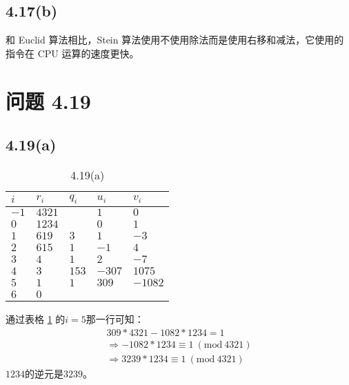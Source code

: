 \documentclass[acmlarge,screen]{acmart}
\begin{document}
\subsection{4.17(b)}
和 Euclid 算法相比，Stein 算法使用不使用除法而是使用右移和减法，它使用的指令在 CPU 运算的速度更快。
\section{问题 4.19}
\subsection{4.19(a)}
\begin{table}
  \caption{4.19(a)}
  \label{tab:4.19(a)}
  \begin{tabular}{m{5em} m{5em} m{5em} m{5em} m{5em}}
    \toprule
    $i$&$r_i$&$q_i$&$u_i$&$v_i$\\
    \midrule
    $-1$&$4321$&&$1$&$0$\\
    $0$&$1234$&&$0$&$1$\\
	$1$&$619$&$3$&$1$&$-3$\\
	$2$&$615$&$1$&$-1$&$4$\\
	$3$&$4$&$1$&$2$&$-7$\\
	$4$&$3$&$153$&$-307$&$1075$\\
	$5$&$1$&$1$&$309$&$-1082$\\
	$6$&$0$&&&\\
  \bottomrule
\end{tabular}
\end{table}
通过表格 \ref{tab:4.19(a)} 的$i=5$那一行可知：
\begin{align*}
	309*4321-1082*1234=1\\
	\Rightarrow-1082*1234\equiv1\ (\text{mod}\ 4321)\\
	\Rightarrow3239*1234\equiv1\ (\text{mod}\ 4321)
\end{align*}
$1234$的逆元是$3239$。
\end{document}
